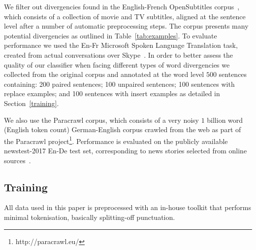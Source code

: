 \documentclass[11pt,a4paper]{article}
\begin{document}
We filter out divergencies found in the English-French OpenSubtitles corpus~\cite{LisonTiedemann2016}, which consists of a collection of movie and TV subtitles, aligned at the sentence level after a number of automatic preprocessing steps. 
The corpus presents many potential divergencies as outlined in Table~\ref{tab:examples}. 
To evaluate performance we used the En-Fr Microsoft Spoken Language Translation task, created from actual conversations over Skype~\cite{mslt-corpus-iwslt-2016-release}. 
In order to better assess the quality of our classifier when facing different types of word divergencies we collected from the original corpus and annotated at the word level $500$ sentences containing:
200 paired sentences;
100 unpaired sentences;
100 sentences with replace examples; and
100 sentences with insert examples as detailed in Section~\ref{training}.

We also use the Paracrawl corpus, which consists of a very noisy $1$ billion word (English token count) German-English corpus crawled from the web as part of the Paracrawl project\footnote{http://paracrawl.eu/}.
Performance is evaluated on the publicly available newstest-2017 En-De test set, corresponding to news stories selected from online sources~\cite{W17-4717}.


\subsection{Training}

All data used in this paper is preprocessed with an in-house toolkit that performs minimal tokenisation, basically splitting-off punctuation.
\end{document}
